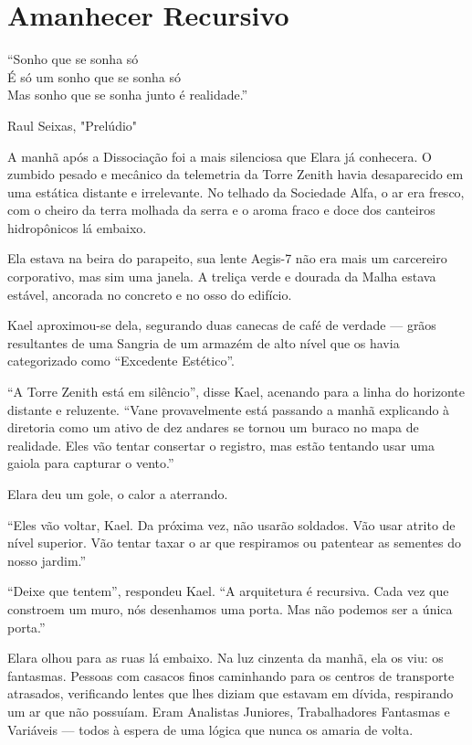 
\chapter{Amanhecer Recursivo}
\epigraph{``Sonho que se sonha só \\ É só um sonho que se sonha só \\ Mas sonho que se sonha junto é realidade.''}{Raul Seixas, "Prelúdio"}

A manhã após a Dissociação foi a mais silenciosa que Elara já conhecera. O zumbido pesado e mecânico da telemetria da Torre Zenith havia desaparecido em uma estática distante e irrelevante. No telhado da Sociedade Alfa, o ar era fresco, com o cheiro da terra molhada da serra e o aroma fraco e doce dos canteiros hidropônicos lá embaixo.

Ela estava na beira do parapeito, sua lente Aegis-7 não era mais um carcereiro corporativo, mas sim uma janela. A treliça verde e dourada da Malha estava estável, ancorada no concreto e no osso do edifício.


Kael aproximou-se dela, segurando duas canecas de café de verdade — grãos resultantes de uma Sangria de um armazém de alto nível que os havia categorizado como ``Excedente Estético''.

``A Torre Zenith está em silêncio'', disse Kael, acenando para a linha do horizonte distante e reluzente. ``Vane provavelmente está passando a manhã explicando à diretoria como um ativo de dez andares se tornou um buraco no mapa de realidade. Eles vão tentar consertar o registro, mas estão tentando usar uma gaiola para capturar o vento.''

Elara deu um gole, o calor a aterrando.

``Eles vão voltar, Kael. Da próxima vez, não usarão soldados. Vão usar atrito de nível superior. Vão tentar taxar o ar que respiramos ou patentear as sementes do nosso jardim.''

``Deixe que tentem'', respondeu Kael. ``A arquitetura é recursiva. Cada vez que constroem um muro, nós desenhamos uma porta. Mas não podemos ser a única porta.''

Elara olhou para as ruas lá embaixo. Na luz cinzenta da manhã, ela os viu: os fantasmas. Pessoas com casacos finos caminhando para os centros de transporte atrasados, verificando lentes que lhes diziam que estavam em dívida, respirando um ar que não possuíam. Eram Analistas Juniores, Trabalhadores Fantasmas e Variáveis — todos à espera de uma lógica que nunca os amaria de volta.

